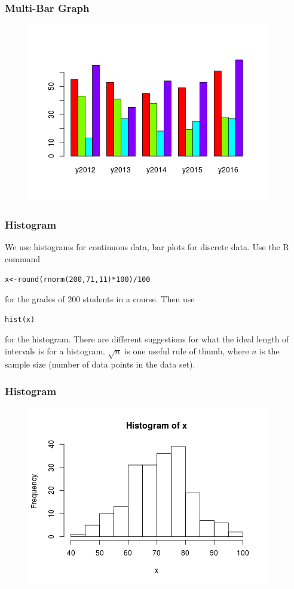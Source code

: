 \documentclass[xcolor=dvipsnames]{beamer}
\begin{document}
\begin{frame}
  \frametitle{Multi-Bar Graph}
\begin{figure}[h]
\includegraphics[scale=.8]{./mbg.png}
\end{figure}
\end{frame}

\begin{frame}
  \frametitle{Histogram}
We use histograms for continuous data, bar plots for discrete data.
Use the R command
\begin{alltt}
  x<-round(rnorm(200,71,11)*100)/100
\end{alltt}
for the grades of 200 students in a course. Then use
\begin{alltt}
  hist(x)
\end{alltt}
for the histogram. There are different suggestions for what the ideal
length of intervals is for a histogram. $\sqrt{n}$ is one useful rule
of thumb, where $n$ is the sample size (number of data points in the
data set). 
\end{frame}

\begin{frame}
  \frametitle{Histogram}
\begin{figure}[h]
\includegraphics[scale=.8]{./histogram.png}
\end{figure}
\end{frame}
\end{document}
